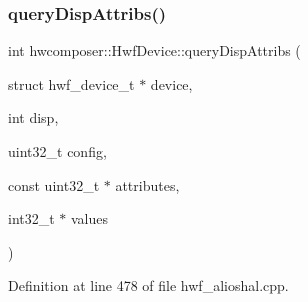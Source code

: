 \subsubsection{\texorpdfstring{query\+Disp\+Attribs()}{queryDispAttribs()}}
{\footnotesize\ttfamily int hwcomposer\+::\+Hwf\+Device\+::query\+Disp\+Attribs (\begin{DoxyParamCaption}\item[{struct hwf\+\_\+device\+\_\+t $\ast$}]{device,  }\item[{int}]{disp,  }\item[{uint32\+\_\+t}]{config,  }\item[{const uint32\+\_\+t $\ast$}]{attributes,  }\item[{int32\+\_\+t $\ast$}]{values }\end{DoxyParamCaption})\hspace{0.3cm}{\ttfamily [static]}}



Definition at line 478 of file hwf\+\_\+alioshal.\+cpp.


